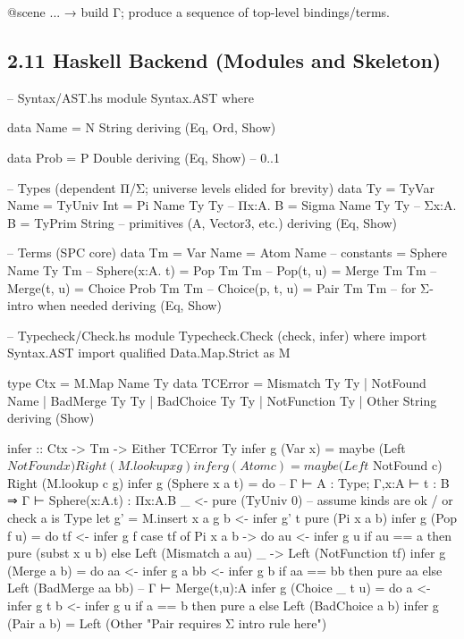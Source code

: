 \documentclass[12pt,a4paper]{article}
\theoremstyle{definition}
\theoremstyle{plain}
\begin{document}
@scene { ... } → build Γ; produce a sequence of top-level bindings/terms.

\subsection*{2.11 Haskell Backend (Modules and Skeleton)}

-- Syntax/AST.hs
module Syntax.AST where

data Name = N String deriving (Eq, Ord, Show)

data Prob = P Double deriving (Eq, Show)   -- 0..1

-- Types (dependent Π/Σ; universe levels elided for brevity)
data Ty
  = TyVar Name
  = TyUniv Int
  = Pi Name Ty Ty        -- Πx:A. B
  = Sigma Name Ty Ty     -- Σx:A. B
  = TyPrim String        -- primitives (A, Vector3, etc.)
  deriving (Eq, Show)

-- Terms (SPC core)
data Tm
  = Var Name
  = Atom Name            -- constants
  = Sphere Name Ty Tm    -- Sphere(x:A. t)
  = Pop Tm Tm            -- Pop(t, u)
  = Merge Tm Tm          -- Merge(t, u)
  = Choice Prob Tm Tm    -- Choice(p, t, u)
  = Pair Tm Tm           -- for Σ-intro when needed
  deriving (Eq, Show)

-- Typecheck/Check.hs
module Typecheck.Check (check, infer) where
import Syntax.AST
import qualified Data.Map.Strict as M

type Ctx = M.Map Name Ty
data TCError = Mismatch Ty Ty | NotFound Name | BadMerge Ty Ty | BadChoice Ty Ty
             | NotFunction Ty | Other String
             deriving (Show)

infer :: Ctx -> Tm -> Either TCError Ty
infer g (Var x)     = maybe (Left $ NotFound x) Right (M.lookup x g)
infer g (Atom c)    = maybe (Left $ NotFound c) Right (M.lookup c g)
infer g (Sphere x a t) = do
  -- Γ ⊢ A : Type; Γ,x:A ⊢ t : B  ⇒ Γ ⊢ Sphere(x:A.t) : Πx:A.B
  _ <- pure (TyUniv 0) -- assume kinds are ok / or check a is Type
  let g' = M.insert x a g
  b <- infer g' t
  pure (Pi x a b)
infer g (Pop f u) = do
  tf <- infer g f
  case tf of
    Pi x a b -> do
      au <- infer g u
      if au == a then pure (subst x u b) else Left (Mismatch a au)
    _        -> Left (NotFunction tf)
infer g (Merge a b) = do
  aa <- infer g a
  bb <- infer g b
  if aa == bb then pure aa else Left (BadMerge aa bb)  -- Γ ⊢ Merge(t,u):A
infer g (Choice _ t u) = do
  a <- infer g t
  b <- infer g u
  if a == b then pure a else Left (BadChoice a b)
infer g (Pair a b) = Left (Other "Pair requires Σ intro rule here")
\end{document}
